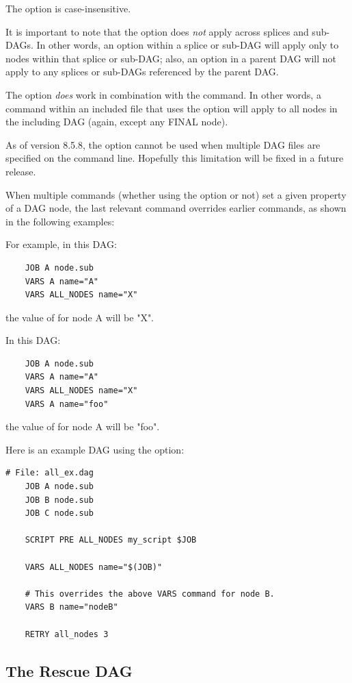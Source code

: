 The  option is case-insensitive.

It is important to note that the  option does \emph{not}
apply across splices and sub-DAGs.  In other words, an 
option within a splice or sub-DAG will apply only to nodes within
that splice or sub-DAG; also, an  option in a parent
DAG will not apply to any splices or sub-DAGs referenced by the
parent DAG.

The  option \emph{does} work in combination with the
 command.  In other words, a command within an included
file that uses the  option will apply to all nodes
in the including DAG (again, except any FINAL node).

As of version 8.5.8, the  option cannot be used when
multiple DAG files are specified on the  command
line.  Hopefully this limitation will be fixed in a future release.

When multiple commands (whether using the  option or not)
set a given property of a DAG node, the last relevant command overrides
earlier commands, as shown in the following examples:

For example, in this DAG:
\begin{verbatim}
    JOB A node.sub
    VARS A name="A"
    VARS ALL_NODES name="X"
\end{verbatim}
the value of  for node A will be "X".

In this DAG:
\begin{verbatim}
    JOB A node.sub
    VARS A name="A"
    VARS ALL_NODES name="X"
    VARS A name="foo"
\end{verbatim}
the value of  for node A will be "foo".

Here is an example DAG using the  option:
\begin{verbatim}
# File: all_ex.dag
    JOB A node.sub
    JOB B node.sub
    JOB C node.sub

    SCRIPT PRE ALL_NODES my_script $JOB

    VARS ALL_NODES name="$(JOB)"

    # This overrides the above VARS command for node B.
    VARS B name="nodeB"

    RETRY all_nodes 3
\end{verbatim}

\subsection{\label{sec:DAGMan-rescue}The Rescue DAG}

